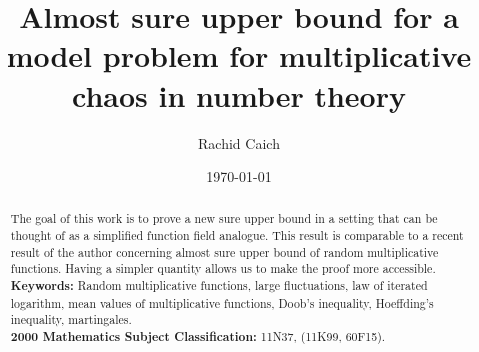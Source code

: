 \documentclass{article}
\title{Almost sure upper bound for a model problem for multiplicative chaos in number theory}
\author{Rachid Caich }
\date{\today}
\begin{document}
\maketitle
\begin{abstract}
The goal of this work is to prove a new  sure upper bound in a setting that can be
thought of as a simplified function field analogue. This result is comparable to a recent result of the author concerning  almost sure upper bound of random multiplicative functions. Having a simpler quantity allows us to make the proof more accessible.\\
   \textbf{Keywords:} Random multiplicative functions, large fluctuations,  law of iterated logarithm, mean values of multiplicative functions, Doob’s inequality, Hoeffding’s inequality, martingales.\\
   \textbf{2000 Mathematics Subject Classification:} 11N37, (11K99, 60F15).
\end{abstract}
\end{document}
